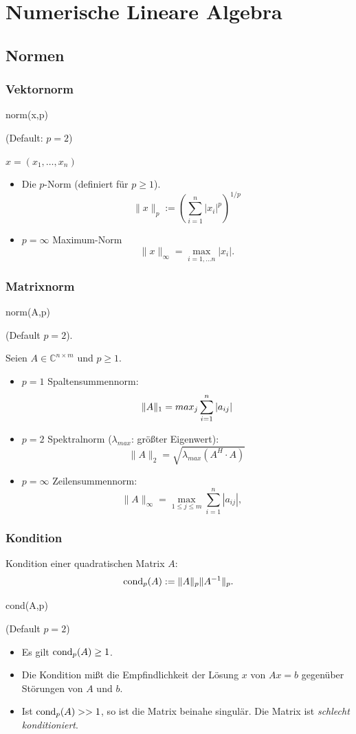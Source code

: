 \documentclass[hyperref={xetex}]{beamer}
\begin{document}
\section{Numerische Lineare Algebra}

\subsection{Normen}
% 
%
\begin{frame}[fragile]\frametitle{Vektornorm}
\begin{matlabin}
norm(x,p) 
\end{matlabin}
(Default: $p=2$) 

$x=(x_1, {} \dots , x_n)$
\begin{itemize}
\item Die $p$-Norm (definiert für $p\geq 1$).
\[ \|x \|_p := \left( \sum_{i=1}^n  |x_i|^p \right)^{1/p} \] 
\item $p=\infty$  Maximum-Norm 
\[  \|x \|_\infty = \max_{i=1, \dots n} |x_i|. \]
\end{itemize}
\end{frame}
% 
%
\begin{frame}[fragile]\frametitle{Matrixnorm}
\begin{matlabin}
norm(A,p) 
\end{matlabin}
(Default $p=2$).

Seien  $A\in \mathbb{C}^{n \times m}$ und $p \geq 1$. 
\begin{itemize}
\item $p=1$ Spaltensummennorm:
\[ 
\| A \|_1 = max_j \sum_{i=1}^n \left\lvert a_{ij}\right\rvert
\]
\item $p=2$ Spektralnorm ($\lambda_{max}$: größter Eigenwert):
\[
\| A \|_2 = \sqrt{\lambda_{max} (A^H \cdot A)}
\]
\item $p=\infty$ Zeilensummennorm:
\[ 
\|A\|_\infty = \max_{1 \leq j \leq m} \sum_{i=1}^n |a_{ij}|, \quad
\]
\end{itemize} 
\end{frame}
% 
%
\begin{frame}[fragile]\frametitle{Kondition}
Kondition einer quadratischen Matrix $A$: 
{ \[ \operatorname{cond}_p(A):=\|A\|_p\|A^{-1}\|_p. \] }
\vspace*{-0.8cm}
\begin{matlabin}
cond(A,p)
\end{matlabin}
(Default $p=2$)
\begin{itemize}
\item Es gilt $\operatorname{cond}_p(A)\geq 1$.
\item Die Kondition mißt die Empfindlichkeit der Lösung $x$ von $Ax=b$
  gegenüber  Störungen
  von $A$ und $b$.
\item Ist $\operatorname{cond}_p(A) >> 1$, so ist die Matrix beinahe singulär. Die Matrix ist {\it schlecht konditioniert}.
\end{itemize}
\end{frame}
\end{document}
